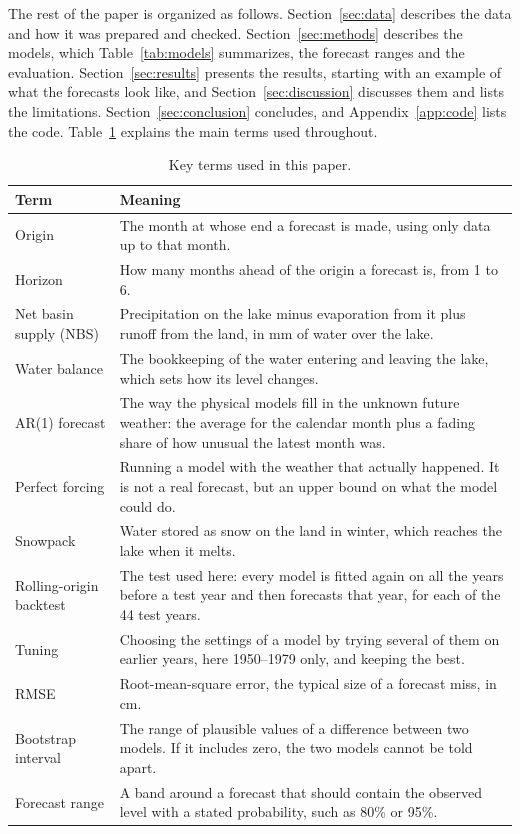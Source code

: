 \documentclass{article}
\begin{document}
The rest of the paper is organized as follows. Section~\ref{sec:data} describes the data and how
it was prepared and checked. Section~\ref{sec:methods} describes the models, which
Table~\ref{tab:models} summarizes, the forecast ranges and the evaluation.
Section~\ref{sec:results} presents the results, starting with an example of what the forecasts
look like, and Section~\ref{sec:discussion} discusses them and lists the limitations.
Section~\ref{sec:conclusion} concludes, and Appendix~\ref{app:code} lists the code.
Table~\ref{tab:terms} explains the main terms used throughout.

\begin{table}[htbp]
\centering
\caption{Key terms used in this paper.}
\label{tab:terms}
\small
\begin{tabular}{||l|>{\raggedright\arraybackslash}p{}||}
\hline\hline
Term & Meaning \\
\hline\hline
Origin & The month at whose end a forecast is made, using only data up to that month. \\
Horizon & How many months ahead of the origin a forecast is, from 1 to 6. \\
Net basin supply (NBS) & Precipitation on the lake minus evaporation from it plus runoff from the
land, in mm of water over the lake. \\
Water balance & The bookkeeping of the water entering and leaving the lake, which sets how its
level changes. \\
AR(1) forecast & The way the physical models fill in the unknown future weather: the average for
the calendar month plus a fading share of how unusual the latest month was. \\
Perfect forcing & Running a model with the weather that actually happened. It is not a real
forecast, but an upper bound on what the model could do. \\
Snowpack & Water stored as snow on the land in winter, which reaches the lake when it melts. \\
Rolling-origin backtest & The test used here: every model is fitted again on all the years before
a test year and then forecasts that year, for each of the 44 test years. \\
Tuning & Choosing the settings of a model by trying several of them on earlier years, here
1950--1979 only, and keeping the best. \\
RMSE & Root-mean-square error, the typical size of a forecast miss, in cm. \\
Bootstrap interval & The range of plausible values of a difference between two models. If it
includes zero, the two models cannot be told apart. \\
Forecast range & A band around a forecast that should contain the observed level with a stated
probability, such as 80\% or 95\%. \\
\hline\hline
\end{tabular}
\end{table}
\end{document}
